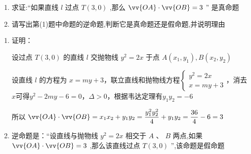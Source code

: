\begin{enumerate}
\begin{enumerate}
        \begin{enumerate}
            \item 求证:“如果直线 $l$ 过点 $T\left( {3,0}\right)$ ,那么 $\vv{OA} \cdot  \vv{OB} = 3$ ” 是真命题
            \item 请写出第(1)题中命题的逆命题,判断它是真命题还是假命题,并说明理由
        \end{enumerate}
        \begin{jieda}
            \begin{enumerate}
                \item 证明：
                
                设过点 $T\left( {3,0}\right)$ 的直线 $l$ 交抛物线 $y^2 = {2x}$ 于点 $A\left( {{x}_{1},{y}_{1}}\right) ,B\left( {{x}_{2},{y}_{2}}\right)$ 
                
                设直线 $l$ 的方程为 $x = my+3$，联立直线和抛物线方程$\left\{  \begin{array}{l} {y}^{2} = {2x} \\  
                x = my+3 \end{array}\right.$，消去$x$可得${y}^{2} - 2my - 6 = 0$，$\Delta > 0$，根据韦达定理有${y}_{1}{y}_{2} =  - 6$
    
                
                所以 $\vv{OA} \cdot  \vv{OB} = {x}_{1}{x}_{2} + {y}_{1}{y}_{2} = \dfrac{y_1^2y_2^2}{4} + {y}_{1}{y}_{2} = \dfrac{36}{4} - 6 = 3$
                \item 逆命题是：“设直线与抛物线 ${y^2} = {2x}$ 相交于 $A$ 、 $B$ 两点,如果 $\vv{OA} \cdot  \vv{OB} = 3$ ,那么该直线过点  $T\left( {3,0}\right)$ ”,该命题是假命题
                

\end{enumerate}
\end{jieda}
\end{enumerate}
\end{enumerate}
